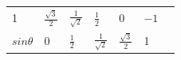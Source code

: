 {{\begin{center}
\begin{xtabular}[t]{|l|l|l|l|l|l|l|}
        1 &
                $\frac{\sqrt{3}}{2}$
               &
                $\frac{1}{\sqrt{2}}$
               &
                $\frac{1}{2}$
               &
        0 &
                $-1$
     \tabularnewline{}
                $sin\theta $
               &
        0 &
                $\frac{1}{2}$
               &
                $\frac{1}{\sqrt{2}}$
               &
                $\frac{\sqrt{3}}{2}$
               &
        1 &

\end{xtabular}
\end{center}}}
